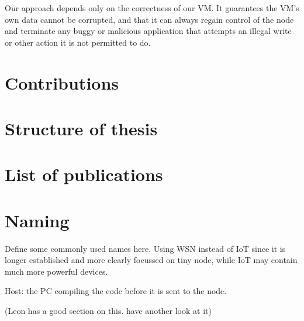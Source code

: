 Our approach depends only on the correctness of our VM. It guarantees the VM's own data cannot be corrupted, and that it can always regain control of the node and terminate any buggy or malicious application that attempts an illegal write or other action it is not permitted to do.

\section{Contributions}

\section{Structure of thesis}

\section{List of publications}

\section{Naming}

Define some commonly used names here. Using WSN instead of IoT since it is longer established and more clearly focussed on tiny node, while IoT may contain much more powerful devices.

Host: the PC compiling the code before it is sent to the node.

(Leon has a good section on this. have another look at it)